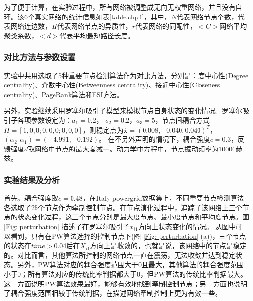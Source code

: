 为了便于计算，在实验过程中，所有网络被调整成无向无权重网络，并且没有自环。该6个真实网络的统计信息如表\ref{table:chp4}，其中，$ N $代表网络节点个数，代表网络连边数，$ H $代表网络节点的异质性，$ r $代表网络的同配性，$ <C> $网络平均聚类系数，$ <d> $代表平均最短路径长度。

\begin{table}[h]
\end{table}

\subsubsection{对比方法与参数设置}
实验中共用选取了5种重要节点检测算法作为对比方法，分别是：度中心性(Degree centrality)、介数中心性(Betweenness centrality)、接近中心性(Closeness centrality)、PageRank算法和ESI方法。

另外，实验继续采用罗塞尔吸引子模型来模拟节点自身状态的变化情况。罗塞尔吸引子各项参数设定为：$  a_1=0.2 $， $ a_2=0.2 $，$ a_3=5 $，节点间耦合方式$ H = [1,0,0;0,0,0;0,0,0] $，则稳定点为$ \overline{\textbf{x}}=(0.008, -0.040, 0.040)^T $，$ (\alpha_2,\alpha_1)=(-4.991, -0.192) $。
在不另外声明的情况下，耦合强度$ c=0.3 $，反馈强度$ d $取网络中节点的最大度减一。动力学中方程中，节点振动频率为$ 10000 $赫兹。

\subsubsection{实验结果及分析}
首先，耦合强度取$ c=0.48 $，在Italy powergrid数据集上，不同重要节点检测算法各选取了25个节点作为牵制控制节点。在节点演化过程中，追踪了该网络上三个节点的状态变化过程，这三个节点分别是最大度节点、最小度节点和平均度节点。图 \ref{Fig: perturbation} 描述了在罗塞尔吸引子$ x_{i1} $方向上状态变化的情况。
从图中可以看到，只有在PW算法选择的控制节点下(图 \ref{Fig: perturbation} (a))，三个节点的状态在$ time>0.04 $后在$ X_{i1} $方向上是收敛的，也就是说，该网络中的节点是稳定的。对比而言，其他算法所控制的网络节点一直在震荡，无法收敛并达到稳定状态。另外，PW算法对应的耦合强度范围大于$ 0 $且最大，其他算法的耦合强度范围小于$ 0 $；所有算法对应的传统比率判据都大于$ 0 $，但PW算法的传统比率判据最大。这一方面说明PW算法效果最好，能够有效地找到牵制控制节点；另一方面也说明了耦合强度范围相较于传统判据，在描述网络牵制控制上更为有效一些。


